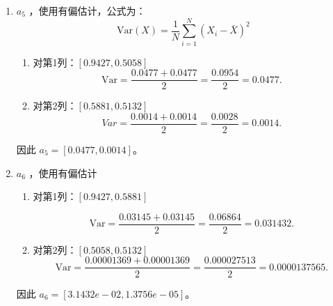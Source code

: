 \begin{example}
\begin{enumerate}[label=\arabic*)]
\begin{enumerate}[itemindent=1em,label=\arabic*)]
                        方差计算：
                        $$\begin{aligned}
                                (0.5058-0.5095)^{2}&=(0.00307)^{2}=0.00001369,\\  
                                (0.5132-0.5095)^{2}&=(0.00435)^{2}=0.00001369.
                        \end{aligned}$$
                        无偏估计方差：
                        $$\mathrm{Var}=\frac{0.00001369+0.00001369}{2-1}=\frac{0.000027513}1=0.000027513\approx0.00002751.$$
                \end{enumerate}
                因此 $a_4=[6.2864e-02,2.7513e-05]$。

                \item $a_5$
                ，使用有偏估计，公式为：
                $$\mathrm{Var}(X)=\frac1N\sum_{i=1}^N(X_i-\bar{X})^2$$
                \begin{enumerate}[itemindent=1em,label=\arabic*)]
                        \item 对第1列：$[0.9427,0.5058]$
                        $$\mathrm{Var}=\frac{0.0477+0.0477}{2}=\frac{0.0954}2=0.0477.$$

                        \item 对第2列：$[0.5881,0.5132]$
                        $$Var = \frac{0.0014+0.0014}2=\frac{0.0028}2=0.0014.$$
                \end{enumerate}
                因此 $a_5=[0.0477,0.0014]$。

                \item $a_6$
                ，使用有偏估计

                \begin{enumerate}[itemindent=1em,label=\arabic*)]
                        \item 对第1列：$[0.9427,0.5881]$

                        $$\mathrm{Var}=\frac{0.03145+0.03145}{2}=\frac{0.06864}2=0.031432.$$

                        \item 对第2列：$[0.5058,0.5132]$
                        $$\mathrm{Var}=\frac{0.00001369+0.00001369}{2}=\frac{0.000027513}2=0.0000137565.$$
                \end{enumerate}
                因此 $a_6=[3.1432e-02,1.3756e-05]$。
        \end{enumerate}
\end{example}

